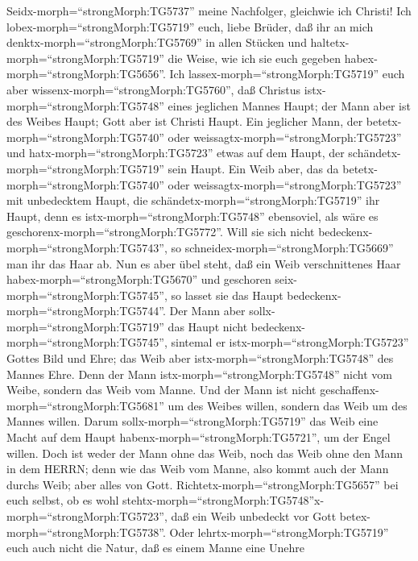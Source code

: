  Seidx-morph=``strongMorph:TG5737'' meine Nachfolger,
gleichwie ich Christi!  Ich
lobex-morph=``strongMorph:TG5719'' euch, liebe Brüder, daß ihr an mich
denktx-morph=``strongMorph:TG5769'' in allen Stücken und
haltetx-morph=``strongMorph:TG5719'' die Weise, wie ich sie euch gegeben
habex-morph=``strongMorph:TG5656''.  Ich
lassex-morph=``strongMorph:TG5719'' euch aber
wissenx-morph=``strongMorph:TG5760'', daß Christus
istx-morph=``strongMorph:TG5748'' eines jeglichen Mannes Haupt; der Mann
aber ist des Weibes Haupt; Gott aber ist Christi Haupt.  Ein
jeglicher Mann, der betetx-morph=``strongMorph:TG5740'' oder
weissagtx-morph=``strongMorph:TG5723'' und
hatx-morph=``strongMorph:TG5723'' etwas auf dem Haupt, der
schändetx-morph=``strongMorph:TG5719'' sein Haupt.  Ein Weib
aber, das da betetx-morph=``strongMorph:TG5740'' oder
weissagtx-morph=``strongMorph:TG5723'' mit unbedecktem Haupt, die
schändetx-morph=``strongMorph:TG5719'' ihr Haupt, denn es
istx-morph=``strongMorph:TG5748'' ebensoviel, als wäre es
geschorenx-morph=``strongMorph:TG5772''.  Will sie sich
nicht bedeckenx-morph=``strongMorph:TG5743'', so
schneidex-morph=``strongMorph:TG5669'' man ihr das Haar ab. Nun es aber
übel steht, daß ein Weib verschnittenes Haar
habex-morph=``strongMorph:TG5670'' und geschoren
seix-morph=``strongMorph:TG5745'', so lasset sie das Haupt
bedeckenx-morph=``strongMorph:TG5744''.  Der Mann aber
sollx-morph=``strongMorph:TG5719'' das Haupt nicht
bedeckenx-morph=``strongMorph:TG5745'', sintemal er
istx-morph=``strongMorph:TG5723'' Gottes Bild und Ehre; das Weib aber
istx-morph=``strongMorph:TG5748'' des Mannes Ehre.  Denn der
Mann istx-morph=``strongMorph:TG5748'' nicht vom Weibe, sondern das Weib
vom Manne.  Und der Mann ist nicht
geschaffenx-morph=``strongMorph:TG5681'' um des Weibes willen, sondern
das Weib um des Mannes willen.  Darum
sollx-morph=``strongMorph:TG5719'' das Weib eine Macht auf dem Haupt
habenx-morph=``strongMorph:TG5721'', um der Engel willen. 
Doch ist weder der Mann ohne das Weib, noch das Weib ohne den Mann in
dem HERRN;  denn wie das Weib vom Manne, also kommt auch
der Mann durchs Weib; aber alles von Gott. 
Richtetx-morph=``strongMorph:TG5657'' bei euch selbst, ob es wohl
stehtx-morph=``strongMorph:TG5748''x-morph=``strongMorph:TG5723'', daß
ein Weib unbedeckt vor Gott betex-morph=``strongMorph:TG5738''.
 Oder lehrtx-morph=``strongMorph:TG5719'' euch auch nicht
die Natur, daß es einem Manne eine Unehre
